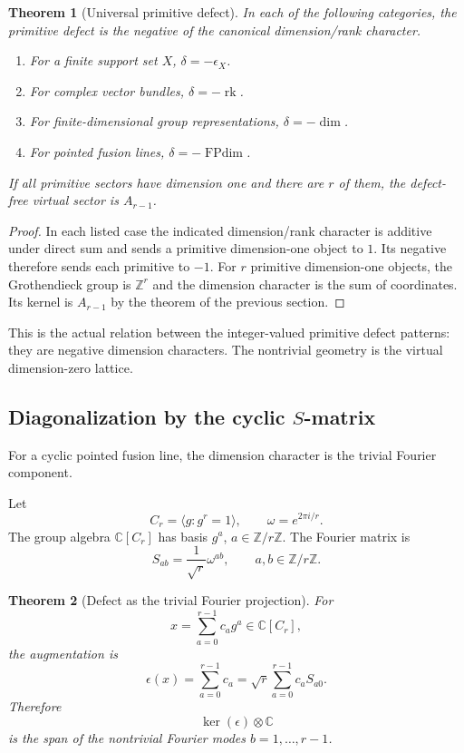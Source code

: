 \documentclass[11pt]{article}
\newtheorem{theorem}{Theorem}[section]
\newcommand{\ZZ}{\mathbb Z}
\newcommand{\CC}{\mathbb C}
\begin{document}
\begin{theorem}[Universal primitive defect]
In each of the following categories, the primitive defect is the negative of the canonical dimension/rank character.
\begin{enumerate}[label=(\roman*)]
\item For a finite support set $X$, $\delta=-\epsilon_X$.
\item For complex vector bundles, $\delta=-\operatorname{rk}$.
\item For finite-dimensional group representations, $\delta=-\dim$.
\item For pointed fusion lines, $\delta=-\operatorname{FPdim}$.
\end{enumerate}
If all primitive sectors have dimension one and there are $r$ of them, the defect-free virtual sector is $A_{r-1}$.
\end{theorem}

\begin{proof}
In each listed case the indicated dimension/rank character is additive under direct sum and sends a primitive dimension-one object to $1$.  Its negative therefore sends each primitive to $-1$.  For $r$ primitive dimension-one objects, the Grothendieck group is $\ZZ^r$ and the dimension character is the sum of coordinates.  Its kernel is $A_{r-1}$ by the theorem of the previous section.
\end{proof}

This is the actual relation between the integer-valued primitive defect patterns: they are negative dimension characters.  The nontrivial geometry is the virtual dimension-zero lattice.

\subsection{Diagonalization by the cyclic $S$-matrix}

For a cyclic pointed fusion line, the dimension character is the trivial Fourier component.

Let
\[
        C_r=\langle g:g^r=1\rangle,
        \qquad \omega=e^{2\pi i/r}.
\]
The group algebra $\CC[C_r]$ has basis $g^a$, $a\in\ZZ/r\ZZ$.  The Fourier matrix is
\[
        S_{ab}=\frac1{\sqrt r}\omega^{ab},\qquad a,b\in\ZZ/r\ZZ.
\]

\begin{theorem}[Defect as the trivial Fourier projection]
For
\[
        x=\sum_{a=0}^{r-1}c_ag^a\in\CC[C_r],
\]
the augmentation is
\[
        \epsilon(x)=\sum_{a=0}^{r-1}c_a
        =\sqrt r\sum_{a=0}^{r-1}c_a S_{a0}.
\]
Therefore
\[
        \ker(\epsilon)\otimes\CC
\]
is the span of the nontrivial Fourier modes $b=1,\ldots,r-1$.
\end{theorem}
\end{document}
